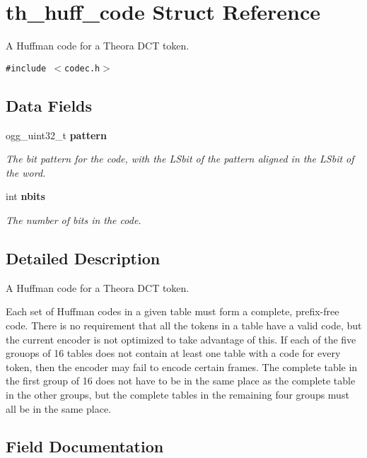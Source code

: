 \section{th\_\-huff\_\-code Struct Reference}
\label{structth__huff__code}
A Huffman code for a Theora DCT token.  


{\tt \#include $<$codec.h$>$}

\subsection*{Data Fields}
\begin{CompactItemize}
\item 
ogg\_\-uint32\_\-t \bf{pattern}
\begin{CompactList}\small\item\em The bit pattern for the code, with the LSbit of the pattern aligned in the LSbit of the word. \item\end{CompactList}\item 
int \bf{nbits}
\begin{CompactList}\small\item\em The number of bits in the code. \item\end{CompactList}\end{CompactItemize}


\subsection{Detailed Description}
A Huffman code for a Theora DCT token. 

Each set of Huffman codes in a given table must form a complete, prefix-free code. There is no requirement that all the tokens in a table have a valid code, but the current encoder is not optimized to take advantage of this. If each of the five grouops of 16 tables does not contain at least one table with a code for every token, then the encoder may fail to encode certain frames. The complete table in the first group of 16 does not have to be in the same place as the complete table in the other groups, but the complete tables in the remaining four groups must all be in the same place. 



\subsection{Field Documentation}
